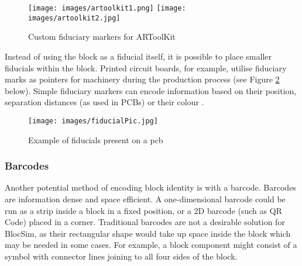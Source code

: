 \begin{figure}[ht!]
\centering
\texttt{[image: images/artoolkit1.png]}
\texttt{[image: images/artoolkit2.jpg]}
\caption{Custom fiduciary markers for ARToolKit \cite{fiducialPic}}
\label{im:fiducialPic}
\end{figure}

\clearpage

Instead of using the block as a fiducial itself, it is possible to place smaller fiducials within the block. Printed circuit boards, for example, utilise fiduciary marks as pointers for machinery during the production process (see Figure \ref{im:fiducialPic} below). Simple fiduciary markers can encode information based on their position, separation distances (as used in PCBs) or their colour \cite{colorFiducial}.

\begin{figure}[ht!]
\centering
\texttt{[image: images/fiducialPic.jpg]}
\caption{Example of fiducials present on a \gls{pcb} \cite{fiducialPic}}
\label{im:fiducialPic}
\end{figure}

\subsubsection{Barcodes}

Another potential method of encoding block identity is with a barcode. Barcodes are information dense and space efficient. A one-dimensional barcode could be run as a strip inside a block in a fixed position, or a 2D barcode (such as QR Code) placed in a corner. Traditional barcodes are not a desirable solution for BlocSim, as their rectangular shape would take up space inside the block which may be needed in some cases. For example, a block component might consist of a symbol with connector lines joining to all four sides of the block.







